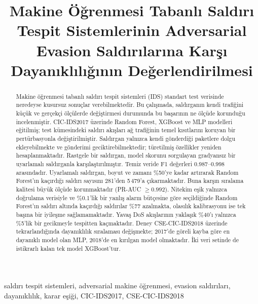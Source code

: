\documentclass[conference]{IEEEtran}
\begin{document}
\renewcommand{\IEEEkeywordsname}{Anahtar Kelimeler}

\title{Makine Öğrenmesi Tabanlı Saldırı Tespit Sistemlerinin Adversarial Evasion Saldırılarına Karşı Dayanıklılığının Değerlendirilmesi}

\author{
}

\maketitle

\begin{abstract}
Makine öğrenmesi tabanlı saldırı tespit sistemleri (IDS) standart test verisinde neredeyse kusursuz sonuçlar verebilmektedir. Bu çalışmada, saldırganın kendi trafiğini küçük ve gerçekçi ölçülerde değiştirmesi durumunda bu başarının ne ölçüde korunduğu incelenmiştir. CIC-IDS2017 üzerinde Random Forest, XGBoost ve MLP modelleri eğitilmiş; test kümesindeki saldırı akışları ağ trafiğinin temel kısıtlarını koruyan bir pertürbasyonla değiştirilmiştir. Saldırgan yalnızca kendi gönderdiği paketlere dolgu ekleyebilmekte ve gönderimi geciktirebilmektedir; türetilmiş özellikler yeniden hesaplanmaktadır. Rastgele bir saldırgan, model skorunu sorgulayan gradyansız bir uyarlamalı saldırganla karşılaştırılmıştır. Temiz veride F1 değerleri 0.987--0.998 arasındadır. Uyarlamalı saldırgan, boyut ve zamanı \%50'ye kadar artırarak Random Forest'ın kaçırdığı saldırı sayısını 281'den 5\,479'a çıkarmaktadır. Buna karşın sıralama kalitesi büyük ölçüde korunmaktadır (PR-AUC $\geq 0.992$). Nitekim eşik yalnızca doğrulama verisiyle ve \%0.1'lik bir yanlış alarm bütçesine göre seçildiğinde Random Forest'ın saldırı altında kaçırdığı saldırılar \%77 azalmakta, olasılık kalibrasyonu ise tek başına bir iyileşme sağlamamaktadır. Yavaş DoS akışlarının yaklaşık \%40'ı yalnızca \%5'lik bir gecikmeyle tespitten kaçmaktadır. Deney CSE-CIC-IDS2018 üzerinde tekrarlandığında dayanıklılık sıralaması değişmekte; 2017'de göreli kayba göre en dayanıklı model olan MLP, 2018'de en kırılgan model olmaktadır. İki veri setinde de istikrarlı kalan tek model XGBoost'tur.
\end{abstract}

\begin{IEEEkeywords}
saldırı tespit sistemleri, adversarial makine öğrenmesi, evasion saldırıları, dayanıklılık, karar eşiği, CIC-IDS2017, CSE-CIC-IDS2018
\end{IEEEkeywords}
\end{document}
